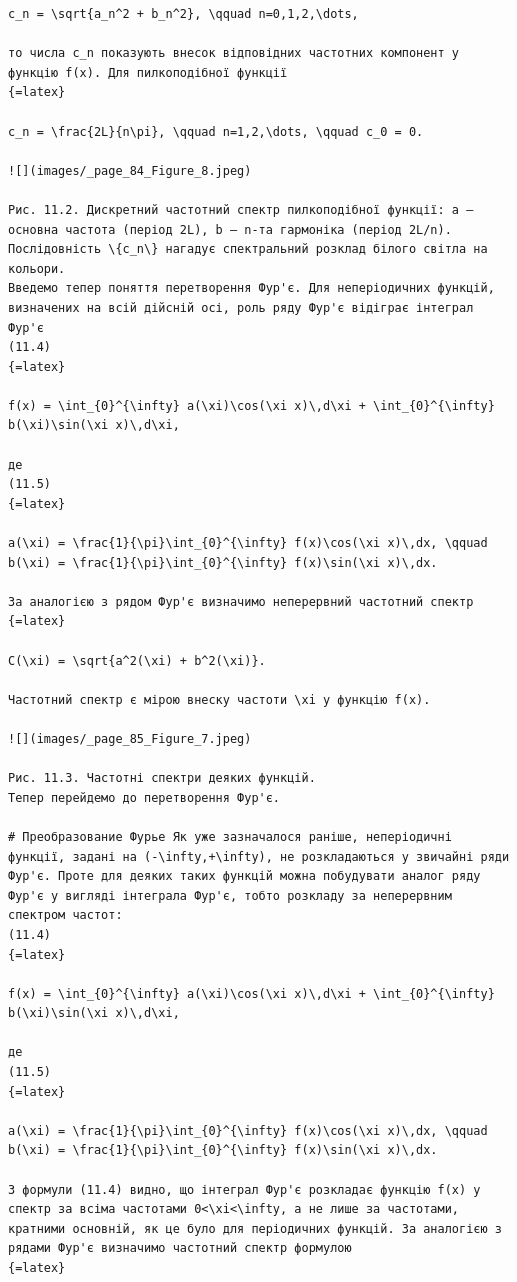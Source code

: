 \documentclass[
  ukrainian,
]{article}
\begin{document}
\begin{verbatim}
c_n = \sqrt{a_n^2 + b_n^2}, \qquad n=0,1,2,\dots,

то числа c_n показують внесок відповідних частотних компонент у функцію f(x). Для пилкоподібної функції
{=latex}

c_n = \frac{2L}{n\pi}, \qquad n=1,2,\dots, \qquad c_0 = 0.

![](images/_page_84_Figure_8.jpeg)

Рис. 11.2. Дискретний частотний спектр пилкоподібної функції: a — основна частота (період 2L), b — n-та гармоніка (період 2L/n).
Послідовність \{c_n\} нагадує спектральний розклад білого світла на кольори.
Введемо тепер поняття перетворення Фур'є. Для неперіодичних функцій, визначених на всій дійсній осі, роль ряду Фур'є відіграє інтеграл Фур'є
(11.4)
{=latex}

f(x) = \int_{0}^{\infty} a(\xi)\cos(\xi x)\,d\xi + \int_{0}^{\infty} b(\xi)\sin(\xi x)\,d\xi,

де
(11.5)
{=latex}

a(\xi) = \frac{1}{\pi}\int_{0}^{\infty} f(x)\cos(\xi x)\,dx, \qquad b(\xi) = \frac{1}{\pi}\int_{0}^{\infty} f(x)\sin(\xi x)\,dx.

За аналогією з рядом Фур'є визначимо неперервний частотний спектр
{=latex}

C(\xi) = \sqrt{a^2(\xi) + b^2(\xi)}.

Частотний спектр є мірою внеску частоти \xi у функцію f(x).

![](images/_page_85_Figure_7.jpeg)

Рис. 11.3. Частотні спектри деяких функцій.
Тепер перейдемо до перетворення Фур'є.

# Преобразование Фурье Як уже зазначалося раніше, неперіодичні функції, задані на (-\infty,+\infty), не розкладаються у звичайні ряди Фур'є. Проте для деяких таких функцій можна побудувати аналог ряду Фур'є у вигляді інтеграла Фур'є, тобто розкладу за неперервним спектром частот:
(11.4)
{=latex}

f(x) = \int_{0}^{\infty} a(\xi)\cos(\xi x)\,d\xi + \int_{0}^{\infty} b(\xi)\sin(\xi x)\,d\xi,

де
(11.5)
{=latex}

a(\xi) = \frac{1}{\pi}\int_{0}^{\infty} f(x)\cos(\xi x)\,dx, \qquad b(\xi) = \frac{1}{\pi}\int_{0}^{\infty} f(x)\sin(\xi x)\,dx.

З формули (11.4) видно, що інтеграл Фур'є розкладає функцію f(x) у спектр за всіма частотами 0<\xi<\infty, а не лише за частотами, кратними основній, як це було для періодичних функцій. За аналогією з рядами Фур'є визначимо частотний спектр формулою
{=latex}


\end{verbatim}
\end{document}
